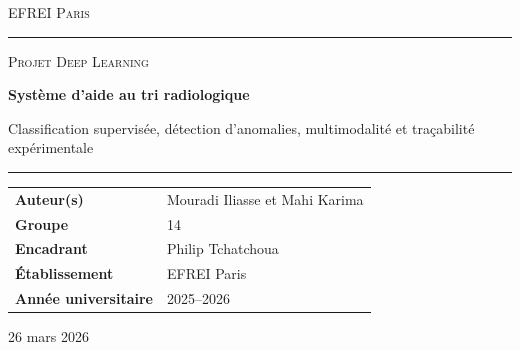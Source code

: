 \documentclass[11pt,a4paper]{article}
\renewcommand{\headrulewidth}{0.4pt}
\begin{document}
\begin{titlepage}
\thispagestyle{empty}
\centering
\vspace*{1.2cm}

\textcolor{unigrey}{\Large \textsc{EFREI Paris}} \par
\vspace{0.8cm}
\rule{0.82\textwidth}{1.1pt}\par
\vspace{1.0cm}
{\Large \textsc{Projet Deep Learning}} \par
\vspace{1.4cm}
{\Huge \bfseries Syst\`eme d'aide au tri radiologique \par}
\vspace{0.6cm}
{\Large Classification supervis\'ee, d\'etection d'anomalies, multimodalit\'e et tra\c{c}abilit\'e exp\'erimentale \par}
\vspace{1.0cm}
\rule{0.82\textwidth}{0.8pt}\par

\vspace{2.2cm}

\renewcommand{\arraystretch}{1.4}
\begin{tabular}{p{4.2cm}p{6.8cm}}
\textbf{Auteur(s)} & Mouradi Iliasse et Mahi Karima \\
\textbf{Groupe} & 14 \\
\textbf{Encadrant} & Philip Tchatchoua \\
\textbf{\'Etablissement} & EFREI Paris \\
\textbf{Ann\'ee universitaire} & 2025--2026 \\
\end{tabular}

\vfill

{\large \textcolor{unigrey}{26 mars 2026} \par}
\end{titlepage}

\fancypagestyle{plain}{
    \fancyhf{}
    \fancyfoot[C]{\thepage}
    \renewcommand{\headrulewidth}{0pt}
}

\begin{abstract}
Ce projet vise \`a concevoir un syst\`eme d'aide au tri radiologique capable d'analyser des radiographies thoraciques, de proposer des scores de pathologies, d'identifier des cas atypiques via reconstruction, d'exploiter une modalit\'e textuelle lorsqu'un compte-rendu est disponible, puis d'exposer le tout dans un prototype applicatif testable localement. Le pipeline a \'et\'e impl\'ement\'e en PyTorch avec suivi obligatoire sous MLflow et interface Streamlit. La partie image principale repose sur ChestMNIST, tandis que la composante multimodale s'appuie sur IU X-Ray / OpenI pour la variante \emph{image + texte} et sur NIH Chest X-rays pour une variante compl\'ementaire \emph{image + m\'etadonn\'ees structur\'ees}. Ce document d\'ecrit les donn\'ees, les pr\'etraitements, les choix de mod\'elisation, les m\'etriques, les outils utilis\'es et l'\'etat des r\'esultats disponibles au moment de l'export.
\end{abstract}
\end{document}
